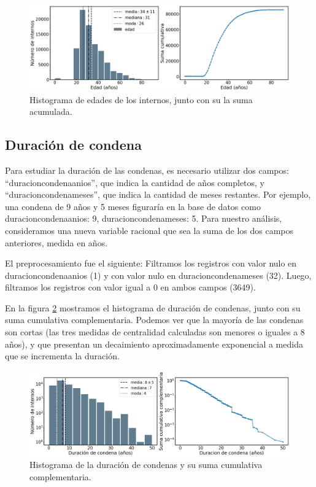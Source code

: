 \documentclass[10pt]{article}
\begin{document}
\begin{figure}[H]
	\centering
	\includegraphics[scale=0.26]{graficos/edad.png}
	\caption{Histograma de edades de los internos, junto con su la suma acumulada. \label{fig:edad}}
\end{figure}

\subsection{Duración de condena}

Para estudiar la duraci\'on de las condenas, es necesario utilizar dos campos: ``duracion\textunderscore condena\textunderscore anios'', que indica la cantidad de a\~nos completos, y ``duracion\textunderscore  condena\textunderscore  meses'', que indica la cantidad de meses restantes. Por ejemplo, una condena de 9 a\~nos y 5 meses figurar\'ia en la base de datos como duracion\textunderscore  condena\textunderscore  anios: 9, duracion\textunderscore  condena\textunderscore  meses: 5. Para nuestro an\'alisis, consideramos una nueva variable racional que sea la suma de los dos campos anteriores, medida en a\~nos. 

El preprocesamiento fue el siguiente: Filtramos los registros con valor nulo en duracion\textunderscore condena\textunderscore anios (1) y con valor nulo en duracion\textunderscore condena\textunderscore meses (32). Luego, filtramos los registros con valor igual a 0 en ambos campos (3649).

En la figura \ref{fig:duracion_condena} mostramos el histograma de duraci\'on de condenas, junto con su suma cumulativa complementaria. Podemos ver que la mayor\'ia de las condenas son cortas (las tres medidas de centralidad calculadas son menores o iguales a 8 a\~nos), y que presentan un decaimiento aproximadamente exponencial a medida que se incrementa la duraci\'on. 

\begin{figure}[H]
	\centering
	\includegraphics[scale=0.26]{graficos/duracion_condena.png}
	\caption{Histograma de la duraci\'on de condenas y su suma cumulativa complementaria. \label{fig:duracion_condena}}
\end{figure}
\end{document}
